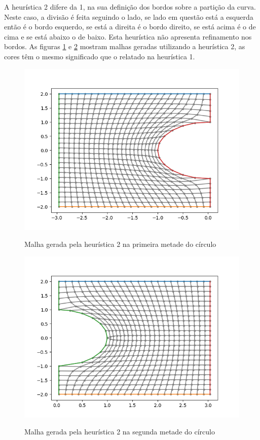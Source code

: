 \documentclass[a4paper]{article}
\begin{document}





A heurística 2 difere da 1, na sua definição dos bordos sobre a partição da curva. Neste caso, a divisão é feita seguindo o lado, se lado em questão está a esquerda então é o bordo esquerdo, se está a direita é o bordo direito, se está acima é o de cima e se está abaixo o de baixo. Esta heurística não apresenta refinamento nos bordos.
As figuras \ref{fig:heuristic2_top1} e \ref{fig:heuristic2_top2} mostram malhas geradas utilizando a heurística 2, as cores têm o mesmo significado que o relatado na heurística 1.


\begin{figure}[h]
	\centering
	\includegraphics[width=1.0\textwidth]{heuristica_2_25pts_top1.png}
	\label{fig:heuristic2_top1} 
	\caption[caption]{Malha gerada pela heurística 2 na primeira metade do círculo}
\end{figure}


\begin{figure}[h]
	\centering
	\includegraphics[width=1.0\textwidth]{heuristica_2_25pts_top2.png}
	\label{fig:heuristic2_top2} 
	\caption[caption]{Malha gerada pela heurística 2 na segunda metade do círculo}
\end{figure}
\end{document}
